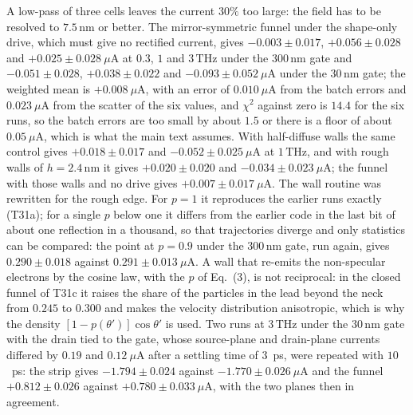 \documentclass[aps,prapplied,onecolumn,superscriptaddress,floatfix]{revtex4-2}
\newcommand{\nm}{\,\mathrm{nm}}
\newcommand{\THz}{\,\mathrm{THz}}
\begin{document}
A low-pass of three cells leaves the current $30\%$ too large: the field
has to be resolved to $7.5\nm$ or better. The mirror-symmetric funnel
under the shape-only drive, which must give no rectified current, gives
$-0.003\pm0.017$, $+0.056\pm0.028$ and $+0.025\pm0.028\ \mu$A at $0.3$,
$1$ and $3\THz$ under the $300\nm$ gate and $-0.051\pm0.028$,
$+0.038\pm0.022$ and $-0.093\pm0.052\ \mu$A under the $30\nm$ gate; the
weighted mean is $+0.008\ \mu$A, with an error of $0.010\ \mu$A from the
batch errors and $0.023\ \mu$A from the scatter of the six values, and
$\chi^{2}$ against zero is
$14.4$ for the six runs, so the batch errors are too small by about
$1.5$ or there is a floor of about $0.05\ \mu$A, which is what the main
text assumes. With half-diffuse walls the same control gives
$+0.018\pm0.017$ and $-0.052\pm0.025\ \mu$A at $1\THz$, and with rough
walls of $h=2.4\nm$ it gives $+0.020\pm0.020$ and $-0.034\pm0.023\ \mu$A;
the funnel with those walls and no drive gives $+0.007\pm0.017\ \mu$A.
The wall routine was rewritten for the rough edge. For $p=1$ it
reproduces the earlier runs exactly (T31a); for a single $p$ below one it
differs from the earlier code in the last bit of about one reflection in
a thousand, so that trajectories diverge and only statistics can be
compared: the point at $p=0.9$ under the $300\nm$ gate, run again, gives
$0.290\pm0.018$ against $0.291\pm0.013\ \mu$A. A wall that re-emits the
non-specular electrons by the cosine law, with the $p$ of
Eq.~(3), is not reciprocal: in the closed funnel of T31c it
raises the share of the particles in the lead beyond the neck from
$0.245$ to $0.300$ and makes the velocity distribution anisotropic,
which is why the density
$[1-p(\theta')]\cos\theta'$ is used. Two runs at
$3\THz$ under the $30\nm$ gate with the drain tied to the gate, whose
source-plane and drain-plane currents differed by $0.19$ and
$0.12\ \mu$A after a settling time of $3$~ps, were repeated with $10$~ps:
the strip gives $-1.794\pm0.024$ against $-1.770\pm0.026\ \mu$A and the
funnel $+0.812\pm0.026$ against $+0.780\pm0.033\ \mu$A, with the two
planes then in agreement.
\end{document}
